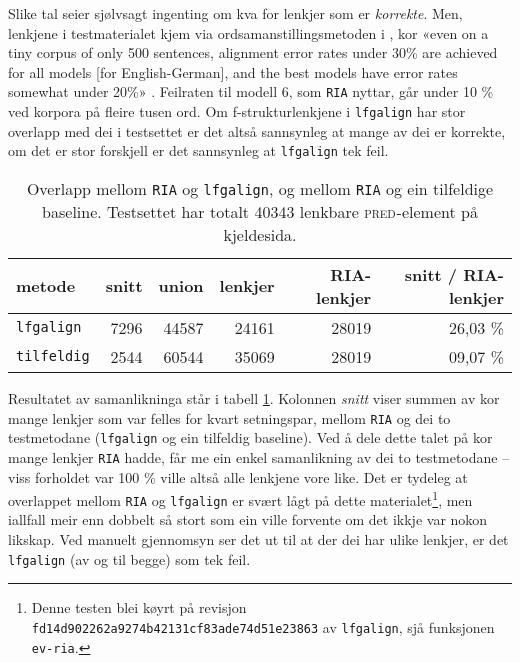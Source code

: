 \documentclass[11pt,a4paper,oneside,draft]{report}
\newcommand{\F}[2]{\textsc{#1}\ensuremath{_{#2}}}
\newcommand{\PRED}{\F{pred}{}}
\begin{document}
 Slike tal seier sjølvsagt ingenting om kva for lenkjer som er
 \emph{korrekte}. Men, lenkjene i testmaterialet kjem via
 ordsamanstillingsmetoden i \citet{och2003scv}, kor «even on a tiny
 corpus of only 500 sentences, alignment error rates under 30\% are
 achieved for all models [for English-German], and the best models
 have error rates somewhat under 20\%»
 \citep[s.~36]{och2003scv}. Feilraten til modell 6, som \texttt{RIA} nyttar,
 går under 10 \% ved korpora på fleire tusen ord. Om f-strukturlenkjene
 i \texttt{lfgalign} har stor overlapp med dei i testsettet er det altså
 sannsynleg at mange av dei er korrekte, om det er stor forskjell er
 det sannsynleg at \texttt{lfgalign} tek feil.


\begin{table}[htb]
\caption{\label{tbl:RIA}Overlapp mellom \texttt{RIA} og \texttt{lfgalign}, og mellom \texttt{RIA} og ein tilfeldige baseline. Testsettet har totalt 40343 lenkbare \PRED{}-element på kjeldesida.}
\begin{center}
\begin{tabular}{lrrrrr}
 metode              &  snitt  &  union  &  lenkjer  &  RIA-lenkjer  &  snitt / RIA-lenkjer  \\
\hline
 \texttt{lfgalign}   &   7296  &  44587  &    24161  &        28019  &  26,03 \%             \\
 \texttt{tilfeldig}  &   2544  &  60544  &    35069  &        28019  &  09,07 \%             \\
\end{tabular}
\end{center}
\end{table}


 Resultatet av samanlikninga står i tabell \ref{tbl:RIA}. Kolonnen
 \emph{snitt} viser summen av kor mange lenkjer som var felles for kvart
 setningspar, mellom \texttt{RIA} og dei to testmetodane (\texttt{lfgalign} og ein
 tilfeldig baseline). Ved å dele dette talet på kor mange lenkjer
 \texttt{RIA} hadde, får me ein enkel samanlikning av dei to testmetodane --
 viss forholdet var 100 \% ville altså alle lenkjene vore like.  Det er
 tydeleg at overlappet mellom \texttt{RIA} og \texttt{lfgalign} er svært lågt på
 dette materialet\footnote{Denne testen blei køyrt på revisjon
        \texttt{fd14d902262a9274b42131cf83ade74d51e23863} av \texttt{lfgalign},
        sjå funksjonen \texttt{ev-ria}. }, men iallfall meir enn dobbelt så stort som
 ein ville forvente om det ikkje var nokon likskap. Ved manuelt
 gjennomsyn ser det ut til at der dei har ulike lenkjer, er det
 \texttt{lfgalign} (av og til begge) som tek feil. 
\end{document}
